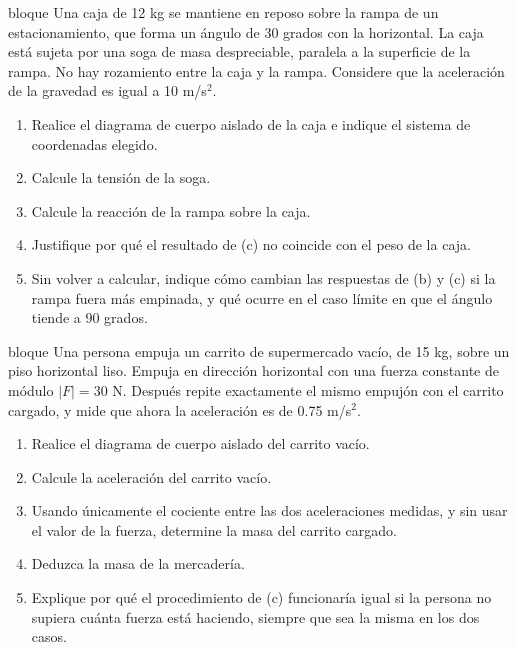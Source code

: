 \documentclass[11pt,openany]{book}
\begin{document}
\begin{ejercicio}{bloque}
Una caja de 12 kg se mantiene en reposo sobre la rampa de un estacionamiento, que forma un ángulo de 30 grados con la horizontal. La caja está sujeta por una soga de masa despreciable, paralela a la superficie de la rampa. No hay rozamiento entre la caja y la rampa. Considere que la aceleración de la gravedad es igual a 10 m/s$^2$.
\begin{enumerate}[label=(\alph*), leftmargin=1.7em, itemsep=1pt, topsep=3pt]
  \item Realice el diagrama de cuerpo aislado de la caja e indique el sistema de coordenadas elegido.
  \item Calcule la tensión de la soga.
  \item Calcule la reacción de la rampa sobre la caja.
  \item Justifique por qué el resultado de (c) no coincide con el peso de la caja.
  \item Sin volver a calcular, indique cómo cambian las respuestas de (b) y (c) si la rampa fuera más empinada, y qué ocurre en el caso límite en que el ángulo tiende a 90 grados.
\end{enumerate}
\end{ejercicio}

\begin{ejercicio}{bloque}
Una persona empuja un carrito de supermercado vacío, de 15 kg, sobre un piso horizontal liso. Empuja en dirección horizontal con una fuerza constante de módulo $|F| = 30$ N. Después repite exactamente el mismo empujón con el carrito cargado, y mide que ahora la aceleración es de 0.75 m/s$^2$.
\begin{enumerate}[label=(\alph*), leftmargin=1.7em, itemsep=1pt, topsep=3pt]
  \item Realice el diagrama de cuerpo aislado del carrito vacío.
  \item Calcule la aceleración del carrito vacío.
  \item Usando únicamente el cociente entre las dos aceleraciones medidas, y sin usar el valor de la fuerza, determine la masa del carrito cargado.
  \item Deduzca la masa de la mercadería.
  \item Explique por qué el procedimiento de (c) funcionaría igual si la persona no supiera cuánta fuerza está haciendo, siempre que sea la misma en los dos casos.
\end{enumerate}
\end{ejercicio}
\end{document}
